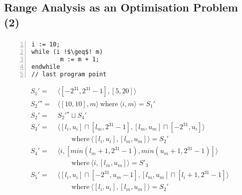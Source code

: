\documentclass[compress]{beamer}
\begin{document}
\subsection{Range Analysis as an Optimisation Problem (2)}
\begin{frame}[fragile]
	\frametitle{\insertsubsection}

\begin{lstlisting}[showlines=true, numbers=left,escapechar=\!]
i := 10;
while (i !$\geq$! m)
        m := m + 1;
endwhile
// last program point
\end{lstlisting}

\vfill

\[
\begin{array}{rl}
S_1' =& \langle [-2^{31}, 2^{31}-1], [5, 20]\rangle\\
S_2'^{\star} =& \langle [10, 10], m\rangle~\text{where}~ \langle i, m\rangle = S_1'\\
S_2' =& S_2'^{\star} \sqcup S_4'\\
S_3' =& \langle [l_i, u_i] \sqcap [l_m, 2^{31}-1], [l_m, u_m] \sqcap [-2^{31}, u_i]\rangle\\
             &\qquad\text{where}~\langle [l_i, u_i], [l_m, u_m]\rangle = S_2'\\
S_4' =& \langle i, [min(l_m + 1, 2^{31}-1), min(u_m + 1, 2^{31} - 1)]\rangle\\
             &\qquad\text{where}~\langle i, [l_m, u_m]\rangle = S'_3\\
S_5' =& \langle [l_i, u_i] \sqcap [-2^{31}, u_m-1], [l_m, u_m] \sqcap [l_i+1, 2^{31}-1]\rangle\\
     &\qquad\text{where}~\langle [l_i, u_i], [l_m, u_m]\rangle = S_2'\\
\end{array}
\]

\end{frame}
\end{document}
